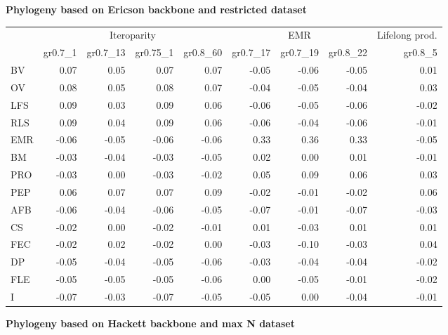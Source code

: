 \begin{landscape}
\begin{table}
\begin{footnotesize}
\textbf{Phylogeny based on Ericson backbone and restricted dataset}

\begin{tabular}{@{}l|rrrr|rrr|r@{}}
\toprule
 & \multicolumn{4}{c|}{Iteroparity} & \multicolumn{3}{c|}{EMR} & \multicolumn{1}{c}{Lifelong prod.}\\
 & gr0.7\_1 & gr0.7\_13 & gr0.75\_1 & gr0.8\_60 & gr0.7\_17 & gr0.7\_19 & gr0.8\_22 & gr0.8\_5\\
\midrule
BV & 0.07 & 0.05 & 0.07 & 0.07 & -0.05 & -0.06 & -0.05 & 0.01\\
OV & 0.08 & 0.05 & 0.08 & 0.07 & -0.04 & -0.05 & -0.04 & 0.03\\
LFS & 0.09 & 0.03 & 0.09 & 0.06 & -0.06 & -0.05 & -0.06 & -0.02\\
RLS & 0.09 & 0.04 & 0.09 & 0.06 & -0.06 & -0.04 & -0.06 & -0.01\\
EMR & -0.06 & -0.05 & -0.06 & -0.06 & 0.33 & 0.36 & 0.33 & -0.05\\
BM & -0.03 & -0.04 & -0.03 & -0.05 & 0.02 & 0.00 & 0.01 & -0.01\\
PRO & -0.03 & 0.00 & -0.03 & -0.02 & 0.05 & 0.09 & 0.06 & 0.03\\
PEP & 0.06 & 0.07 & 0.07 & 0.09 & -0.02 & -0.01 & -0.02 & 0.06\\
AFB & -0.06 & -0.04 & -0.06 & -0.05 & -0.07 & -0.01 & -0.07 & -0.03\\
CS & -0.02 & 0.00 & -0.02 & -0.01 & 0.01 & -0.03 & 0.01 & 0.01\\
FEC & -0.02 & 0.02 & -0.02 & 0.00 & -0.03 & -0.10 & -0.03 & 0.04\\
DP & -0.05 & -0.04 & -0.05 & -0.06 & -0.03 & -0.04 & -0.04 & -0.02\\
FLE & -0.05 & -0.05 & -0.05 & -0.06 & 0.00 & -0.05 & -0.01 & -0.02\\
I & -0.07 & -0.03 & -0.07 & -0.05 & -0.05 & 0.00 & -0.04 & -0.01\\
\bottomrule
\end{tabular}
\end{footnotesize}
\end{table}


\clearpage%

\begin{table}
\center
\begin{footnotesize}

\textbf{Phylogeny based on Hackett backbone and max N dataset}


\end{footnotesize}
\end{table}
\end{landscape}
